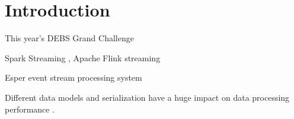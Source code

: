 
\section{Introduction}


This year's DEBS Grand Challenge \cite{debs2022challenge}









Spark Streaming \cite{zaharia2010spark}, Apache Flink streaming \cite{alexandrov2014stratosphere}

Esper event stream processing system \cite{Bernhardt2007}


Different data models and serialization have a huge impact on data processing performance \cite{DBLP:conf/cloud/SikdarTJ17}. 

